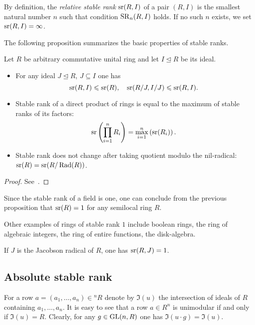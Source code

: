 By definition, the {\it relative stable rank} $\operatorname{sr}(R,I)$ of a pair $(R,I)$ is the smallest natural number $n$ such that condition $\operatorname{SR}_n(R,I)$ holds.
If no such $n$ exists, we set $\operatorname{sr}(R,I)=\infty$.

The following proposition summarizes the basic properties of stable ranks.
\begin{prop} \label{prop:sr_properties}
Let $R$ be arbitrary commutative unital ring and let $I\trianglelefteq R$ be its ideal.
\begin{itemize}
\item For any ideal $J\trianglelefteq R$, $J\subseteq I$ one has 
\[ \operatorname{sr}(R,I)\leqslant\operatorname{sr}(R),\quad\operatorname{sr}(R/J,I/J)\leqslant\operatorname{sr}(R,I). \]
\item Stable rank of a direct product of rings is equal to the maximum of stable ranks of its factors:
\[ \operatorname{sr}\left(\prod\limits_{i=1}^n R_i\right)=\max\limits_{i=1}^n\left(\operatorname{sr}(R_i)\right). \]
\item Stable rank does not change after taking quotient modulo the nil-radical: $\operatorname{sr}(R)=\operatorname{sr}(R/\operatorname{Rad}(R))$.
\end{itemize}
\end{prop}
\begin{proof} See~\cite{Va71}. \end{proof}

\begin{example}
Since the stable rank of a field is one, one can conclude from the previous proposition that $\operatorname{sr}(R)=1$ for any semilocal ring $R$.
\end{example}
\begin{example}
Other examples of rings of stable rank $1$ include boolean rings, the ring of algebraic integers, the ring of entire functions, the disk-algebra.
\end{example}
\begin{example}
If $J$ is the Jacobson radical of $R$, one has $\operatorname{sr}(R,J)=1$.
\end{example}

\subsection{Absolute stable rank}
For a row $a=(a_1,\ldots,a_n)\in{}^n\!R$ denote by $\mathfrak{I}(u)$ the intersection of ideals of $R$ containing $a_1,\ldots,a_n$.
It is easy to see that a row $a\in R^n$ is unimodular if and only if $\mathfrak{I}(u)=R$. 
Clearly, for any $g\in\operatorname{GL}(n,R)$ one has $\mathfrak{I}(u\cdot g)=\mathfrak{I}(u)$.


